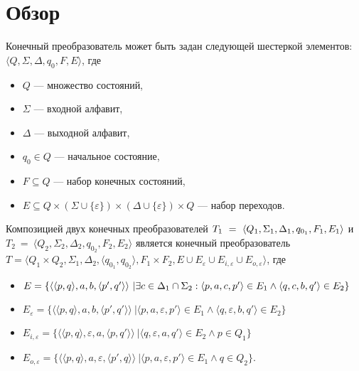 \section{Обзор}
Конечный преобразователь может быть задан следующей шестеркой элементов: $\langle Q, \Sigma, \Delta, q_0, F, E \rangle$, где

\begin{itemize}
\item $Q$ — множество состояний, 
\item $\Sigma$ — входной алфавит, 
\item $\Delta$ — выходной алфавит, 
\item $q_0 \in Q$ — начальное состояние, 
\item $F \subseteq Q$ — набор конечных состояний, 
\item $E \subseteq Q \times (\Sigma \cup \{\varepsilon\}) \times (\Delta \cup \{\varepsilon\})  \times Q$ — набор переходов. 
\end{itemize}

Композицией двух конечных преобразователей $T_1~=~\langle Q_1, \Sigma_1, \Delta_1, q_{0_{1}}, \\F_1, E_1 \rangle$ и $T_2~=~\langle Q_2, \Sigma_2, \Delta_2, q_{0_{2}}, F_2, E_2 \rangle$ является конечный преобразователь  $T =\langle Q_1  \times Q_2, \Sigma_1, \Delta_2, \langle q_{0_{1}}, q_{0_{2}} \rangle, F_1 \times F_2, E \cup E_{\varepsilon} \cup E_{i,\varepsilon} \cup E_{o,\varepsilon} \rangle$, где 

\begin{itemize}
\item $E = \{ \langle \langle p, q \rangle, a, b, \langle p', q' \rangle \rangle\ | \exists c \in \Delta_1 \cap \Sigma_2 : \langle p, a, c, p' \rangle \in E_1 \wedge \\\langle q, c, b, q' \rangle \in E_2\}$
\item $E_{\varepsilon} = \{ \langle \langle p, q \rangle, a, b, \langle p', q' \rangle \rangle\ | \langle p, a, {\varepsilon}, p' \rangle \in E_1 \wedge \langle q, {\varepsilon}, b, q' \rangle \in E_2\}$
\item $E_{i, \varepsilon} = \{ \langle \langle p, q \rangle, {\varepsilon}, a, \langle p, q' \rangle \rangle\ | \langle q, {\varepsilon}, a, q' \rangle \in E_2 \wedge p \in Q_1 \} $
\item $E_{o, \varepsilon} = \{ \langle \langle p, q \rangle,  a, {\varepsilon}, \langle p', q \rangle \rangle\ | \langle p, a, {\varepsilon}, p' \rangle \in E_1 \wedge q \in Q_2 \}. $
\end{itemize}

